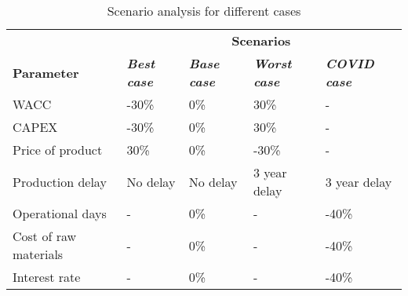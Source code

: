 
\begin{wraptable}{r}{18cm}
\centering
\caption{Scenario analysis for different cases}
\label{scenario_analysis}
\begin{tabular}{lllll}
\rowcolor[HTML]{D2F3FA} 
                      & \multicolumn{4}{c}{\cellcolor[HTML]{D2F3FA}\textbf{Scenarios}}                                                          \\
\rowcolor[HTML]{D2F3FA} 
\textbf{Parameter}    & \textit{\textbf{Best case}} & \textit{\textbf{Base case}} & \textit{\textbf{Worst case}} & \textit{\textbf{COVID case}} \\
WACC                  & -30\%                       & 0\%                         & 30\%                         & -                            \\
CAPEX                 & -30\%                       & 0\%                         & 30\%                         & -                            \\
Price of product      & 30\%                        & 0\%                         & -30\%                        & -                            \\
Production delay      & No delay                    & No delay                    & 3 year delay                 & 3 year delay                 \\
Operational days      & -                           & 0\%                         & -                            & -40\%                        \\
Cost of raw materials & -                           & 0\%                         & -                            & -40\%                        \\
Interest rate         & -                           & 0\%                         & -                            & -40\%                       
\end{tabular}
\end{wraptable}

